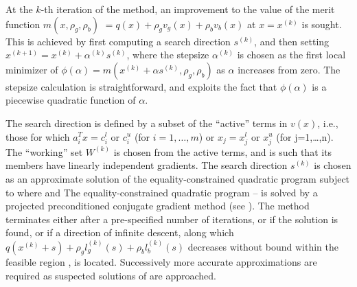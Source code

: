 \documentclass[twoside]{article}
\begin{document}
At the $k$-th iteration of the method, an improvement to the value
of the merit function
$m(x, \rho_g, \rho_b )$ $= q(x) + \rho_g v_g(x) + \rho_b v_b(x)$
at $x = x^{(k)}$ is sought. This is achieved by first
computing a search direction $s^{(k)}$,
and then setting $x^{(k+1)} = x^{(k)} + \alpha^{(k)} s^{(k)}$,
where the stepsize $\alpha^{(k)}$ is chosen as the first local minimizer of
$\phi ( \alpha ) = m( x^{(k)} + \alpha s^{(k)} , \rho_g, \rho_b )$
as $\alpha$ increases from zero.
The stepsize calculation is straightforward, and exploits the fact that
$\phi ( \alpha )$ is a piecewise quadratic function of $\alpha$.

The search direction is defined by a subset of the ``active'' terms in
$v(x)$, i.e., those for which
$a_i^T x = c_i^l$ or $c_i^u$ (for $i=1,\ldots ,m$) or
$x_j = x_j^l$ or $x_j^u$ (for {j=1,\ldots ,n}).
The ``working'' set $W^{(k)}$ is chosen from the active terms, and is such
that its members have linearly independent gradients.
The search direction $s^{(k)}$ is chosen as an approximate solution of
the equality-constrained quadratic program
subject to
where
and
The equality-constrained quadratic program -- is solved by
a projected preconditioned conjugate gradient
method (see ). The method terminates
either after a pre-specified number of iterations, or if the solution is found,
or if a direction of infinite descent, along which
$q(x^{(k)} + s) + \rho_g l_g^{(k)} (s) + \rho_b l_b^{(k)} (s)$
decreases without bound within the feasible region , is located.
Successively more accurate approximations are required as suspected
solutions of  are approached.
\end{document}
